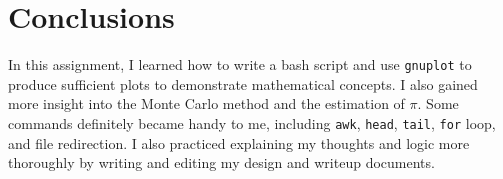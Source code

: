 \documentclass[12pt]{article}
\begin{document}
\section{Conclusions}

In this assignment, I learned how to write a bash script and use \texttt{gnuplot} to produce sufficient plots to demonstrate mathematical concepts. I also gained more insight into the Monte Carlo method and the estimation of $\pi$. Some commands definitely became handy to me, including \texttt{awk}, \texttt{head}, \texttt{tail}, \texttt{for} loop, and file redirection. I also practiced explaining my thoughts and logic more thoroughly by writing and editing my design and writeup documents. 
\end{document}
